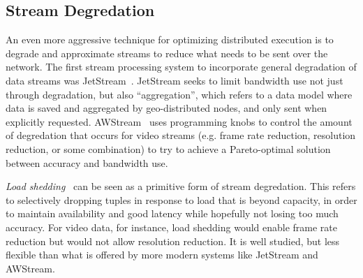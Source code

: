 \subsection{Stream Degredation}

An even more aggressive technique for optimizing distributed execution is to degrade and approximate streams to reduce what needs to be sent over the network.
The first stream processing system to incorporate general degradation of data streams was JetStream~\cite{rabkin2014jetstream}.
JetStream seeks to limit bandwidth use not just through degradation, but also ``aggregation'', which refers to a data model where data is saved and aggregated by geo-distributed nodes, and only sent when explicitly requested.
AWStream~\cite{zhang2018awstream} uses programming knobs to control the amount of degredation that occurs for video streams (e.g. frame rate reduction, resolution reduction, or some combination) to try to achieve a Pareto-optimal solution between accuracy and bandwidth use.

\emph{Load shedding}~\cite{tatbul2003load,tatbul2007staying} can be seen as a primitive form of stream degredation.
This refers to selectively dropping tuples in response to load that is beyond capacity, in order to maintain availability and good latency while hopefully not losing too much accuracy.
For video data, for instance, load shedding would enable frame rate reduction but would not allow resolution reduction. It is well studied, but less flexible than what is offered by more modern systems like JetStream and AWStream.
